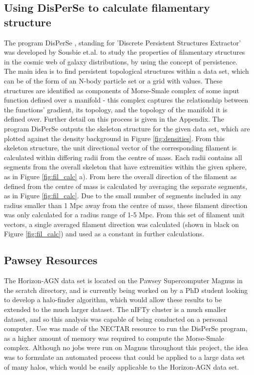 \documentclass[journal]{IEEEtran}
\begin{document}
\subsection{Using DisPerSe to calculate filamentary structure}
The program DisPerSe \cite{sousbie11a}, standing for 'Discrete Persistent Structures Extractor' was developed by Sousbie et.al. to study the properties of filamentary structures in the cosmic web of galaxy distributions, by using the concept of persistence. The main idea is to find persistent topological structures within a data set, which can be of the form of an N-body particle set or a grid with values. These structures are identified as components of Morse-Smale complex of some input function defined over a manifold - this complex captures the relationship between the functions' gradient, its topology, and the topology of the manifold it is defined over. Further detail on this process is given in the Appendix.
The program DisPerSe outputs the skeleton structure for the given data set, which are plotted against the density background in Figure \ref{fig:densities}. From this skeleton structure, the unit directional vector of the corresponding filament is calculated within differing radii from the centre of mass. Each radii contains all segments from the overall skeleton that have extremities within the given sphere, as in Figure \ref{fig:fil_calc} a). From here the overall direction of the filament as defined from the centre of mass is calculated by averaging the separate segments, as in Figure \ref{fig:fil_calc}. Due to the small number of segments included in any radius smaller than 1 Mpc away from the centre of mass, these filament direction was only calculated for a radius range of 1-5 Mpc. From this set of filament unit vectors, a single averaged filament direction was calculated (shown in black on Figure \ref{fig:fil_calc}) and used as a constant in further calculations.
\subsection{Pawsey Resources}
The Horizon-AGN data set is located on the Pawsey Supercomputer Magnus in the scratch directory, and is currently being worked on by a PhD student looking to develop a halo-finder algorithm, which would allow these results to be extended to the much larger dataset. The nIFTy cluster is a much smaller dataset, and so this analysis was capable of being conducted on a personal computer. Use was made of the NECTAR resource to run the DisPerSe program, as a higher amount of memory was required to compute the Morse-Smale complex. Although no jobs were run on Magnus throughout this project, the idea was to formulate an automated process that could be applied to a large data set of many halos, which would be easily applicable to the Horizon-AGN data set. 
\end{document}
